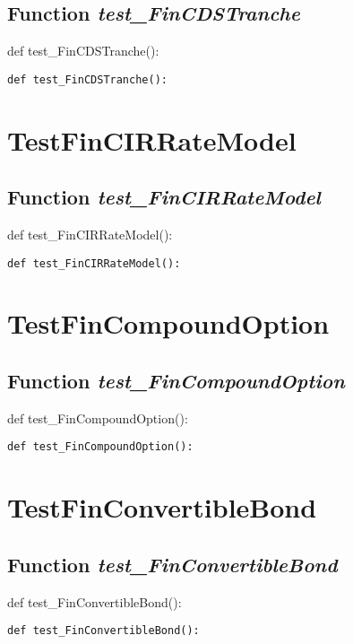 \documentclass[twoside,11pt]{book}
\begin{document}
\subsection{Function {\it test\_FinCDSTranche}}
def test\_FinCDSTranche():

\begin{lstlisting}
def test_FinCDSTranche():
\end{lstlisting}


\newpage
\section{TestFinCIRRateModel}

\subsection{Function {\it test\_FinCIRRateModel}}
def test\_FinCIRRateModel():

\begin{lstlisting}
def test_FinCIRRateModel():
\end{lstlisting}


\newpage
\section{TestFinCompoundOption}

\subsection{Function {\it test\_FinCompoundOption}}
def test\_FinCompoundOption():

\begin{lstlisting}
def test_FinCompoundOption():
\end{lstlisting}


\newpage
\section{TestFinConvertibleBond}

\subsection{Function {\it test\_FinConvertibleBond}}
def test\_FinConvertibleBond():

\begin{lstlisting}
def test_FinConvertibleBond():
\end{lstlisting}


\newpage
\end{document}
